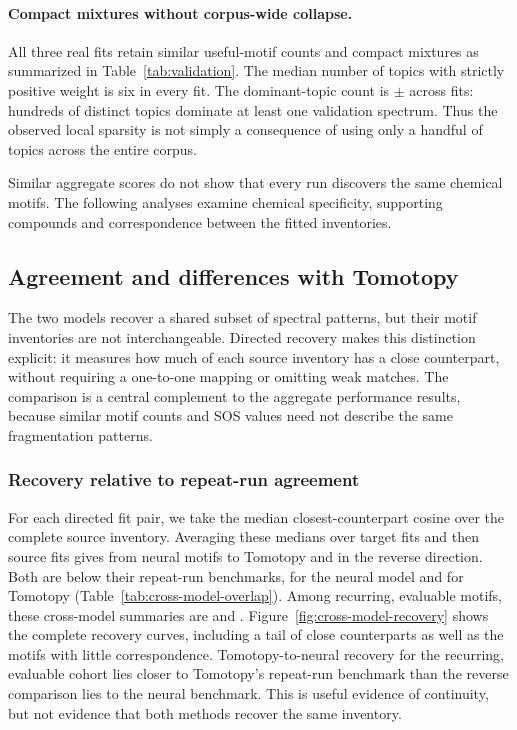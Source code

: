 \documentclass[10pt,a4paper]{article}
\begin{document}
\paragraph{Compact mixtures without corpus-wide collapse.}

All three real fits retain similar useful-motif counts and compact mixtures
as summarized in Table~\ref{tab:validation}. The median number of topics with strictly positive weight is six in every fit. The dominant-topic count is
\CurrentWinnersMean{}$\pm$\CurrentWinnersSD{} across fits: hundreds of distinct
topics dominate at least one validation spectrum.
Thus the observed local sparsity is not simply a consequence of using only
a handful of topics across the entire corpus.

Similar aggregate scores do not show that every run discovers the same
chemical motifs. The following analyses examine chemical specificity,
supporting compounds and correspondence between the fitted inventories.

\subsection{Agreement and differences with Tomotopy}
\label{sec:cross-model-overlap}

The two models recover a shared subset of spectral patterns, but their
motif inventories are not interchangeable. Directed recovery makes this
distinction explicit: it measures how much of each source inventory has a
close counterpart, without requiring a one-to-one mapping or omitting weak
matches. The comparison is a central complement to the aggregate performance
results, because similar motif counts and SOS values need not describe the
same fragmentation patterns.

\subsubsection{Recovery relative to repeat-run agreement}

For each directed fit pair, we take the median closest-counterpart cosine
over the complete source inventory. Averaging these medians over target fits
and then source fits gives \OverlapNLAllCos{} from neural motifs to Tomotopy and
\OverlapLNAllCos{} in the reverse direction. Both are below their repeat-run
benchmarks, \OverlapNNAllCos{} for the neural model and
\OverlapLLAllCos{} for Tomotopy (Table~\ref{tab:cross-model-overlap}).
Among recurring, evaluable motifs, these cross-model summaries are
\OverlapNLRecurringCos{} and \OverlapLNRecurringCos{}.
Figure~\ref{fig:cross-model-recovery} shows the complete recovery curves,
including a tail of close counterparts as well as the motifs with little
correspondence. Tomotopy-to-neural recovery for the recurring, evaluable
cohort lies closer to Tomotopy's repeat-run benchmark than the reverse
comparison lies to the neural benchmark. This is useful evidence of continuity,
but not evidence that both methods recover the same inventory.
\end{document}
